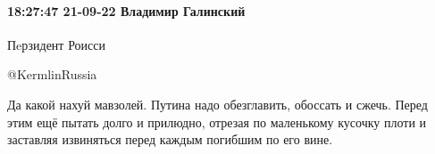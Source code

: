  
 
 
 
 


\paragraph{18:27:47 21-09-22 Владимир Галинский}

Пeрзидент Роисси

@KermlinRussia

Да какой нахуй мавзолей. Путина надо обезглавить, обоссать и сжечь. Перед этим ещё пытать долго и прилюдно, отрезая по маленькому кусочку плоти и заставляя извиняться перед каждым погибшим по его вине.
